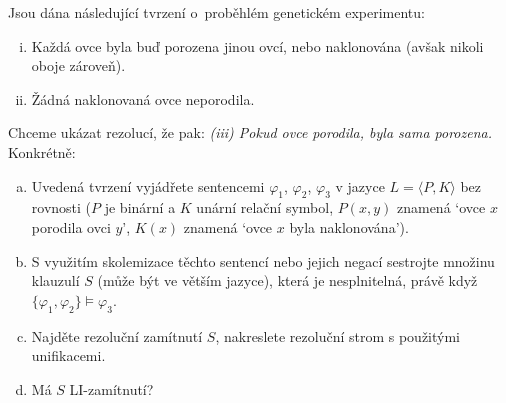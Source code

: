 \begin{problem}

    Jsou dána následující tvrzení o~proběhlém genetickém experimentu:
    \begin{enumerate}[(i)]\it
        \item Každá ovce byla buď porozena jinou ovcí, nebo naklonována (avšak nikoli oboje zároveň).
        \item Žádná naklonovaná ovce neporodila.
    \end{enumerate}
    Chceme ukázat rezolucí, že pak: {\it (iii) Pokud ovce porodila, byla sama porozena.} Konkrétně:
    \begin{enumerate}[(a)]
        \item Uvedená tvrzení vyjádřete sentencemi $\varphi_1$, $\varphi_2$, $\varphi_3$ v jazyce $L=\langle P,K\rangle$ bez rovnosti ($P$ je binární a $K$ unární relační symbol, $P(x,y)$ znamená `ovce $x$ porodila ovci $y$', $K(x)$ znamená `ovce $x$ byla naklonována').
        \item S využitím skolemizace těchto sentencí nebo jejich negací sestrojte množinu klauzulí $S$ (může být ve větším jazyce), která je nesplnitelná, právě když  $\{\varphi_1, \varphi_2\} \models \varphi_3$. %
        \item Najděte rezoluční zamítnutí $S$, nakreslete rezoluční strom s použitými unifikacemi.
        \item Má $S$ LI-zamítnutí?
    \end{enumerate}


\end{problem}
